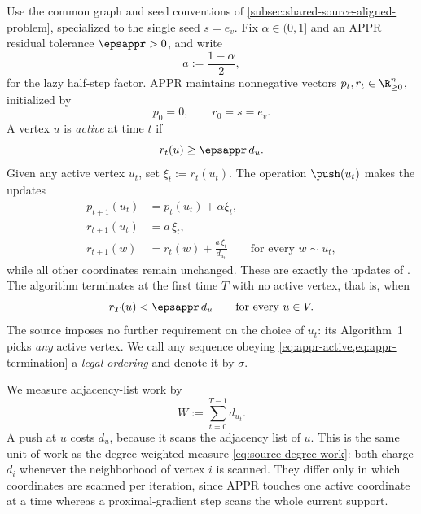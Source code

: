 Use the common graph and seed conventions of
\cref{subsec:shared-source-aligned-problem}, specialized to the single seed
\(s=e_v\). Fix \(\alpha\in(0,1]\) and an APPR residual tolerance
\(\epsappr>0\), and write
\begin{equation}
    a:=\frac{1-\alpha}{2},
    \label{eq:appr-lazy-factor}
\end{equation}
for the lazy half-step factor. APPR maintains nonnegative vectors
\(p_t,r_t\in\R_{\geq0}^{n}\), initialized by
\begin{equation}
    p_0=0,
    \qquad
    r_0=s=e_v.
    \label{eq:appr-initialization}
\end{equation}
A vertex \(u\) is \emph{active} at time \(t\) if
\begin{equation}
    r_t(u)\geq\epsappr\,d_u.
    \label{eq:appr-active}
\end{equation}
Given any active vertex \(u_t\), set \(\xi_t:=r_t(u_t)\). The operation
\(\push(u_t)\) makes the updates
\begin{align}
    p_{t+1}(u_t)
        &=p_t(u_t)+\alpha \xi_t,
        \label{eq:appr-push-p}\\
    r_{t+1}(u_t)
        &=a\,\xi_t,
        \label{eq:appr-push-self}\\
    r_{t+1}(w)
        &=r_t(w)+\frac{a\,\xi_t}{d_{u_t}}
        \qquad\text{for every }w\sim u_t,
        \label{eq:appr-push-neighbor}
\end{align}
while all other coordinates remain unchanged. These are exactly the updates of
\citet[Definition~3.3]{andersen2007using}. The algorithm terminates at the
first time \(T\) with no active vertex, that is, when
\begin{equation}
    r_T(u)<\epsappr\,d_u
    \qquad\text{for every }u\in V.
    \label{eq:appr-termination}
\end{equation}
The source imposes no further requirement on the choice of \(u_t\): its
Algorithm~1 picks \emph{any} active vertex. We call any sequence obeying
\cref{eq:appr-active,eq:appr-termination} a \emph{legal ordering} and denote it
by \(\sigma\).

We measure adjacency-list work by
\begin{equation}
    W:=\sum_{t=0}^{T-1}d_{u_t}.
    \label{eq:appr-work}
\end{equation}
A push at \(u\) costs \(d_u\), because it scans the adjacency list of \(u\).
This is the same unit of work as the degree-weighted measure
\cref{eq:source-degree-work}: both charge \(d_i\) whenever the neighborhood of
vertex \(i\) is scanned. They differ only in which coordinates are scanned per
iteration, since APPR touches one active coordinate at a time whereas a
proximal-gradient step scans the whole current support.

